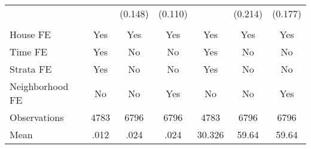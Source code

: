 {\begin{tabular}{l*{6}{c}}
                &         &  (0.148)&  (0.110)&         &  (0.214)&  (0.177)\\
                &         &         &         &         &         &         \\
House FE        &      Yes&      Yes&      Yes&      Yes&      Yes&      Yes\\
Time FE         &      Yes&       No&       No&      Yes&       No&       No\\
Strata FE       &      Yes&       No&       No&      Yes&       No&       No\\
Neighborhood FE &       No&       No&      Yes&       No&       No&      Yes\\
\hline
Observations    &     4783&     6796&     6796&     4783&     6796&     6796\\
Mean            &     .012&     .024&     .024&   30.326&    59.64&    59.64\\
\hline\hline
\end{tabular}
}

